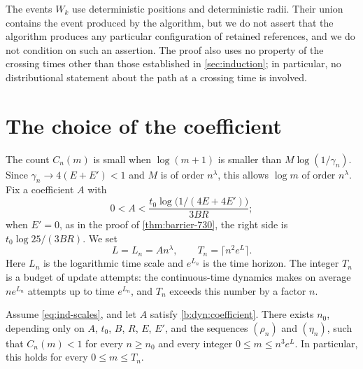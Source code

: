 The events $W_k$ use deterministic positions and deterministic radii. Their union contains the event produced by the algorithm, but we do not assert that the algorithm produces any particular configuration of retained references, and we do not condition on such an assertion. The proof also uses no property of the crossing times other than those established in \cref{sec:induction}; in particular, no distributional statement about the path at a crossing time is involved.

\section{The choice of the coefficient}\label{sec:bp-coefficient}

The count $C_n(m)$ is small when $\log(m+1)$ is smaller than $M\log(1/\gamma_n)$. Since $\gamma_n\to4(E+E')<1$ and $M$ is of order $n^\lambda$, this allows $\log m$ of order $n^\lambda$. Fix a coefficient $A$ with
\begin{equation}\label{b:dyn:coefficient}
 0<A<\frac{t_0\log\bigl(1/(4E+4E')\bigr)}{3BR};
\end{equation}
when $E'=0$, as in the proof of \cref{thm:barrier-730}, the right side is $t_0\log25/(3BR)$. We set
\begin{equation}\label{eq:bp-horizon}
 L=L_n=An^{\lambda},\qquad T_n=\bigl\lceil n^2e^{L}\bigr\rceil.
\end{equation}
Here $L_n$ is the logarithmic time scale and $e^{L_n}$ is the time horizon. The integer $T_n$ is a budget of update attempts: the continuous-time dynamics makes on average $ne^{L_n}$ attempts up to time $e^{L_n}$, and $T_n$ exceeds this number by a factor $n$.

\begin{lemma}\label{lem:bp-coefficient}
Assume \eqref{eq:ind-scales}, and let $A$ satisfy \eqref{b:dyn:coefficient}. There exists $n_0$, depending only on $A$, $t_0$, $B$, $R$, $E$, $E'$, and the sequences $(\rho_n)$ and $(\eta_n)$, such that $C_n(m)<1$ for every $n\ge n_0$ and every integer $0\le m\le n^3e^{L}$. In particular, this holds for every $0\le m\le T_n$.
\end{lemma}


